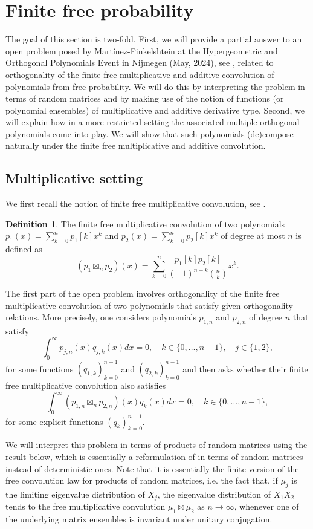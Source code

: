 \documentclass[a4paper,12pt,oneside]{article}
\theoremstyle{definition}
\newtheorem{defi}{Definition}[section]
\begin{document}
\section{Finite free probability} \label{FFP}

The goal of this section is two-fold. First, we will provide a partial answer to an open problem posed by Martínez-Finkelshtein at the Hypergeometric and Orthogonal Polynomials Event in Nijmegen (May, 2024), see \cite{HOPE}, related to orthogonality of the finite free multiplicative and additive convolution of polynomials from free probability. We will do this by interpreting the problem in terms of random matrices and by making use of the notion of functions (or polynomial ensembles) of multiplicative and additive derivative type. Second, we will explain how in a more restricted setting the associated multiple orthogonal polynomials come into play. We will show that such polynomials (de)compose naturally under the finite free multiplicative and additive convolution.


\subsection{Multiplicative setting}

We first recall the notion of finite free multiplicative convolution, see \cite[Def. 1.4]{MSS:fin_free_conv}.

\begin{defi}
    The finite free multiplicative convolution of two polynomials $p_1(x) = \sum_{k=0}^n p_1[k] x^k $ and $p_2(x) = \sum_{k=0}^n p_2[k] x^k $ of degree at most $n$ is defined as
        $$ (p_1 \boxtimes_n p_2)(x) = \sum_{k=0}^n \frac{p_1[k]p_2[k]}{(-1)^{n-k} \binom{n}{k}} x^k . $$
\end{defi}

The first part of the open problem involves orthogonality of the finite free multiplicative convolution of two polynomials that satisfy given orthogonality relations. More precisely, one considers polynomials $p_{1,n}$ and $p_{2,n}$ of degree $n$ that satisfy
    $$\int_0^\infty p_{j,n}(x) q_{j,k}(x) dx = 0,\quad k\in\{0,\dots,n-1\},\quad j\in\{1,2\},$$
for some functions $(q_{1,k})_{k=0}^{n-1}$ and $(q_{2,k})_{k=0}^{n-1}$ and then asks whether their finite free multiplicative convolution also satisfies
    $$\int_0^\infty (p_{1,n}\boxtimes_n p_{2,n})(x) q_k(x) dx = 0,\quad k\in\{0,\dots,n-1\},$$
for some explicit functions $(q_k)_{k=0}^{n-1}$.
\medbreak

We will interpret this problem in terms of products of random matrices using the result below, which is essentially a reformulation of \cite[Thm. 1.5]{MSS:fin_free_conv} in terms of random matrices instead of deterministic ones. Note that it is essentially the finite version of the free convolution law for products of random matrices, i.e. the fact that, if $\mu_j$ is the limiting eigenvalue distribution of $X_j$, the eigenvalue distribution of $X_1X_2$ tends to the free multiplicative convolution $\mu_1\boxtimes\mu_2$ as $n\to\infty$, whenever one of the underlying matrix ensembles is invariant under unitary conjugation.
\end{document}
